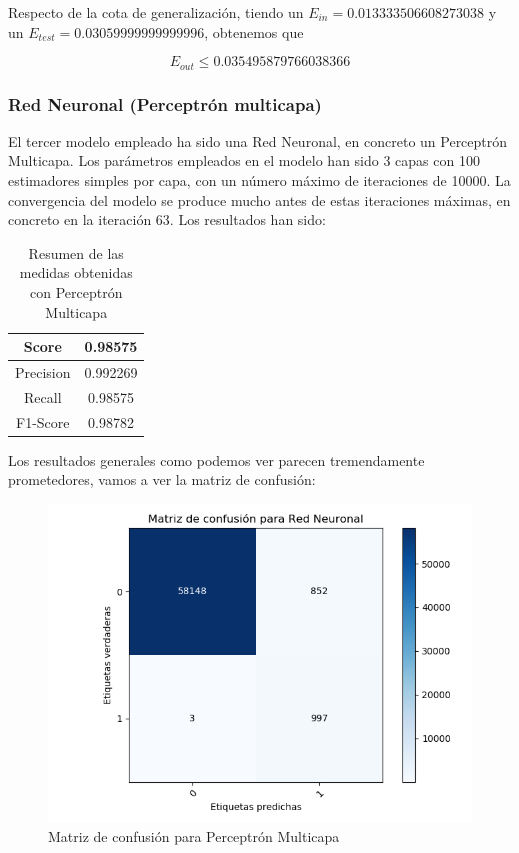 Respecto de la cota de generalización, tiendo un $E_{in}= 0.013333506608273038$ y un $E_{test} = 0.03059999999999996$, obtenemos que

$$E_{out} \leq 0.035495879766038366$$


\subsubsection{Red Neuronal (Perceptrón multicapa)}

El tercer modelo empleado ha sido una Red Neuronal, en concreto un Perceptrón Multicapa. Los parámetros empleados en el modelo han sido 3 capas con 100 estimadores simples por capa, con un número máximo de iteraciones de 10000. La convergencia del modelo se produce mucho antes de estas iteraciones máximas, en concreto en la iteración 63. Los resultados han sido:

\begin{table}[H]
	\centering
	\begin{tabular}{|c|c|}
		\hline
		Score     & 0.98575   \\ \hline
		Precision & 0.992269  \\ \hline
		Recall    & 0.98575   \\ \hline
		F1-Score  & 0.98782 \\ \hline
	\end{tabular}
	\caption{Resumen de las medidas obtenidas con Perceptrón Multicapa}
\end{table}

Los resultados generales como podemos ver parecen tremendamente prometedores, vamos a ver la matriz de confusión:

\begin{figure}[H] %
	\centering
	\includegraphics[scale=0.6]{CONF-NEURONAL.png}  %
	\caption{Matriz de confusión para Perceptrón Multicapa} 
	\label{fig:conf-pmc}
\end{figure}

